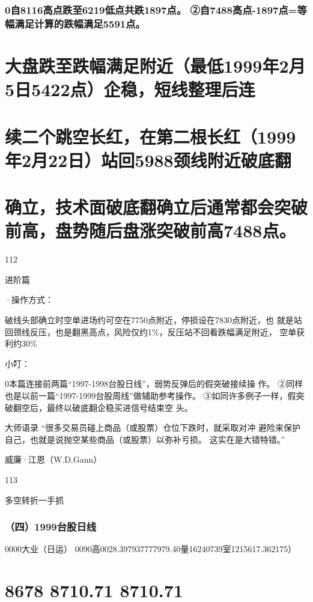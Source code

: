\documentclass{article}
\begin{document}
\subsubsection{0自8116高点跌至6219低点共跌1897点。 ②自7488高点-1897点=等幅满足计算的跌幅满足5591点。}

\section{大盘跌至跌幅满足附近（最低1999年2月5日5422点）企稳，短线整理后连}

\section{续二个跳空长红，在第二根长红（1999年2月22日）站回5988颈线附近破底翻}

\section{确立，技术面破底翻确立后通常都会突破前高，盘势随后盘涨突破前高7488点。}

112

\clearpage

进阶篇

·操作方式：

破线头部确立时空单进场约可空在7750点附近，停损设在7830点附近，也 就是站回颈线反压，也是翻黑高点，风险仅约1\%，反压站不回看跌幅满足附近， 空单获利约30\%

小叮：

0本篇连接前两篇“1997-1998台股日线”，弱势反弹后的假突破接续操 作。 ②同样也是以前一篇“1997-1999台股周线”做辅助参考操作。 ③如同许多例子一样，假突破翻空后，最终以破底翻企稳买进信号结束空 头。

大师语录 “很多交易员碰上商品（或股票）仓位下跌时，就采取对冲 避险来保护自己，也就是说抛空某些商品（或股票）以弥补亏损。 这实在是大错特错。”

威廉·江恩（W.D.Gann）

113

\clearpage

多空转折一手抓

\subsubsection{（四）1999台股日线}

0000大业（日运） 0090高0028.397937777979.40量16240739室1215617.362175）

\section{8678 8710.71 8710.71}
\end{document}
